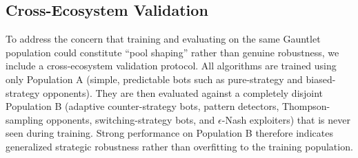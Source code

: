 \documentclass[sigconf,anonymous]{aamas}
\begin{document}
\begin{table}[h!]
\centering
\caption{Gauntlet Robustness Score (Mean [95\% CI]) across 32 seeds (Part 2: PSRO and PRPO)}
\label{tab:gauntlet_part2}
\end{table}

\iffalse
\subsection{Cross-Ecosystem Validation}

To address the concern that training and evaluating on the same Gauntlet population could constitute ``pool shaping'' rather than genuine robustness, we include a cross-ecosystem validation protocol. All algorithms are trained using only Population A (simple, predictable bots such as pure-strategy and biased-strategy opponents). They are then evaluated against a completely disjoint Population B (adaptive counter-strategy bots, pattern detectors, Thompson-sampling opponents, switching-strategy bots, and $\epsilon$-Nash exploiters) that is never seen during training. Strong performance on Population B therefore indicates generalized strategic robustness rather than overfitting to the training population.

\begin{table}[h!]
\centering
\small
\caption{Cross-Ecosystem Validation -- Rock-Paper-Scissors. Train: Population A (simple bots) $\rightarrow$ Evaluate: Population B (adaptive, unseen).}
\label{tab:cross_rps}
\end{table}
\end{document}
